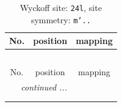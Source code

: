 \documentclass[fleqn,8pt]{jsarticle}
\begin{document}
\renewcommand{\arraystretch}{1.2}
\begin{longtable}{ccc}
\caption{Wyckoff site: {\tt 24l}, site symmetry: {\tt m'..}}
 \\
 \hline \hline
No. & position & mapping \\ \hline \endfirsthead

\multicolumn{2}{l}{\tablename\ \thetable{}} \\
 \hline \hline
No. & position & mapping \\ \hline \endhead

 \hline \hline
\multicolumn{2}{r}{\footnotesize\it continued ...} \\ \endfoot

 \hline \hline
\multicolumn{2}{r}{} \\ \endlastfoot


\end{longtable}
\end{document}
